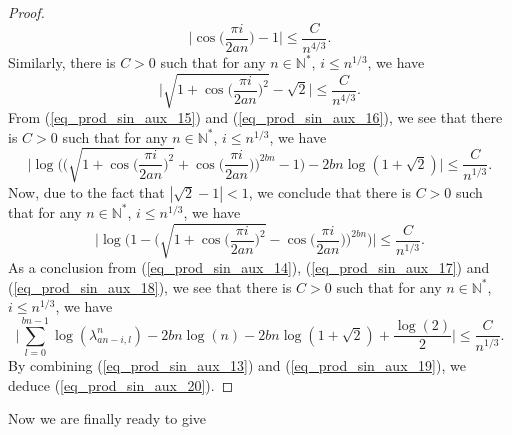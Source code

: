 \documentclass[12pt]{article}
\numberwithin{equation}{section}
\theoremstyle{theorem}
\theoremstyle{definition}
\theoremstyle{remark}
\newcommand{\nat}{\mathbb{N}}
\begin{document}
\begin{proof}
\begin{equation}
				\Big| \cos  \big( \frac{\pi i}{2 a n} \big) - 1 \Big| \leq \frac{C}{n^{4/3}}.
			\end{equation}
			Similarly, there is $C > 0$ such that for any $n \in \nat^*$, $i \leq  n^{1/3}$, we have
			\begin{equation}\label{eq_prod_sin_aux_16}
				\Big| \sqrt{ 1 + \cos  \big( \frac{\pi i}{2 a n} \big)^2} - \sqrt{2} \Big| \leq \frac{C}{n^{4/3}}.
			\end{equation}
			From (\ref{eq_prod_sin_aux_15}) and (\ref{eq_prod_sin_aux_16}), we see that there is $C > 0$ such that for any $n \in \nat^*$, $i \leq  n^{1/3}$, we have
			\begin{equation}\label{eq_prod_sin_aux_17}
				\bigg|
				\log 
				\Big(
					\Big( \sqrt{ 1 + \cos  \big( \frac{\pi i}{2 a n} \big)^2} + \cos  \big( \frac{\pi i}{2 a n} \big)  \Big)^{2bn} - 1
				\Big)
				-
				2bn \log(1 + \sqrt{2})
				\bigg|
				\leq
				\frac{C}{n^{1/3}}.
			\end{equation}
			Now, due to the fact that $|\sqrt{2} - 1| < 1$, we conclude that there is $C > 0$ such that for any $n \in \nat^*$, $i \leq  n^{1/3}$, we have
			\begin{equation}\label{eq_prod_sin_aux_18}
				\bigg|
				\log 
				\Big(
					1- \Big( \sqrt{ 1 + \cos  \big( \frac{\pi i}{2 a n} \big)^2} - \cos  \big( \frac{\pi i}{2 a n} \big)  \Big)^{2bn}
				\Big)
				\bigg|
				\leq
				\frac{C}{n^{1/3}}.
			\end{equation}
			As a conclusion from (\ref{eq_prod_sin_aux_14}), (\ref{eq_prod_sin_aux_17}) and (\ref{eq_prod_sin_aux_18}), we see that there is $C > 0$ such that for any $n \in \nat^*$, $i \leq  n^{1/3}$, we have
			\begin{equation}\label{eq_prod_sin_aux_19}
				\bigg|
				\sum_{l = 0}^{bn - 1} 
				\log(\lambda_{an-i, l}^{n})
				-
				2bn \log(n) 
				-
				2bn \log(1 + \sqrt{2})
				+
				\frac{\log(2)}{2}
				\bigg|
				\leq
				\frac{C}{n^{1/3}}.
			\end{equation}
			By combining (\ref{eq_prod_sin_aux_13}) and   (\ref{eq_prod_sin_aux_19}), we deduce (\ref{eq_prod_sin_aux_20}).
		\end{proof}
		Now we are finally ready to give 
\end{document}
